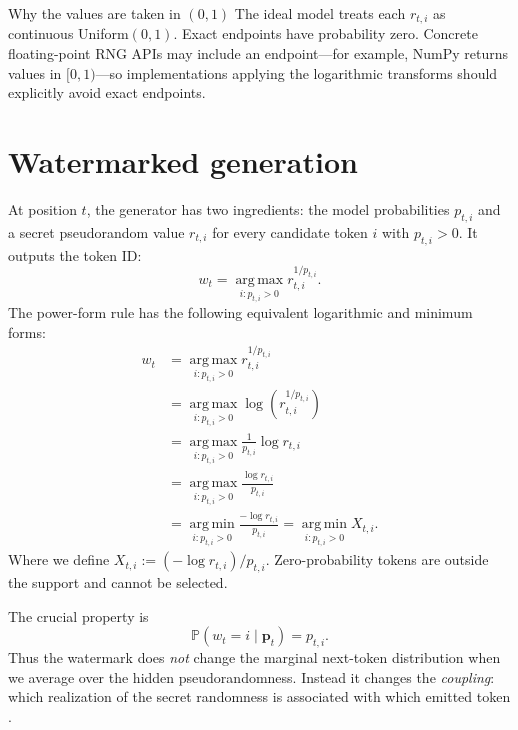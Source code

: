 \documentclass[11pt]{article}
\DeclareRobustCommand{\iperpaper}[2]{%
  \begingroup
  \hypersetup{pdfborder=0 0 0}%
  \href{iperpaper:#1}{{\color{iperpaperlink}#2}}%
  \endgroup
}
\def\iperpaper#1#2{#2}%
\newcommand{\Pp}{\mathbb{P}}
\newcommand{\argmax}{\operatorname*{arg\,max}}
\newcommand{\argmin}{\operatorname*{arg\,min}}
\begin{document}
\begin{leveltwo}{Why the values are taken in \texorpdfstring{$(0,1)$}{(0,1)}}
The ideal model treats each $r_{t,i}$ as continuous \iperpaper{uniform_name}{Uniform}$(0,1)$. Exact endpoints have probability zero. Concrete floating-point RNG APIs may include an endpoint---for example, NumPy returns values in $[0,1)$---so implementations applying the logarithmic transforms should explicitly avoid exact endpoints.
\end{leveltwo}

\section{Watermarked generation}

At position $t$, the generator has two ingredients: the model probabilities $p_{t,i}$ and a secret pseudorandom value $r_{t,i}$ for every candidate token $i$ with $p_{t,i}>0$. It outputs the token ID:
\begin{equation}
  \iperpaper{emitted_token}{w_t}=\iperpaper{generation_argmax}{\argmax_{i:p_{t,i}>0}} \iperpaper{generation_score}{r_{t,i}^{1/p_{t,i}}}.
  \label{eq:generation}
\end{equation}
The power-form rule has the following equivalent logarithmic and minimum forms:
\begin{equation}
\begin{aligned}
  \iperpaper{emitted_token}{w_t}
  &=\iperpaper{derivation_power_form}{\argmax_{i:p_{t,i}>0}r_{t,i}^{1/p_{t,i}}}\\
  &=\iperpaper{derivation_monotone_log}{\argmax_{i:p_{t,i}>0}\log\!\left(r_{t,i}^{1/p_{t,i}}\right)}\\
  &=\iperpaper{derivation_log_power}{\argmax_{i:p_{t,i}>0}\frac{1}{p_{t,i}}\log r_{t,i}}\\
  &=\iperpaper{derivation_fraction_form}{\argmax_{i:p_{t,i}>0}\frac{\log r_{t,i}}{p_{t,i}}}\\
  &=\iperpaper{derivation_sign_reversal}{\argmin_{i:p_{t,i}>0}\frac{-\log r_{t,i}}{p_{t,i}}}
  =\iperpaper{argmin_symbol}{\argmin}_{i:p_{t,i}>0}\iperpaper{race_time}{X_{t,i}}.
\end{aligned}
  \label{eq:log-min-forms}
\end{equation}
Where we define $\iperpaper{race_time}{X_{t,i}:=(-\log r_{t,i})/p_{t,i}}$.
Zero-probability tokens are outside the support and cannot be selected.

The crucial property is
\begin{equation}
  \iperpaper{unbiasedness}{\Pp(w_t=i\mid\mathbf p_t)=p_{t,i}}.
  \label{eq:unbiased-summary}
\end{equation}
Thus the watermark does \emph{not} change the marginal next-token distribution when we average over the hidden pseudorandomness. Instead it changes the \emph{coupling}: which realization of the secret randomness is associated with which emitted token \cite{aaronson2022,li2025}.
\end{document}
